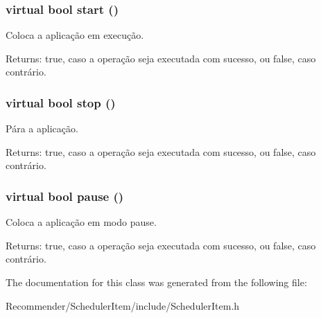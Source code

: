 \subsubsection{\setlength{\rightskip}{0pt plus 5cm}virtual bool start ()\hspace{0.3cm}{\tt  [pure virtual]}}\label{classbr_1_1ufscar_1_1lince_1_1ginga_1_1recommender_1_1SchedulerItem_d64c54ab3191981b2443c47007f38516}


Coloca a aplicação em execução. \begin{Desc}
\item[Returns:]true, caso a operação seja executada com sucesso, ou false, caso contrário. \end{Desc}
\subsubsection{\setlength{\rightskip}{0pt plus 5cm}virtual bool stop ()\hspace{0.3cm}{\tt  [pure virtual]}}\label{classbr_1_1ufscar_1_1lince_1_1ginga_1_1recommender_1_1SchedulerItem_913e49a415a81ff266f461523a0c66da}


Pára a aplicação. \begin{Desc}
\item[Returns:]true, caso a operação seja executada com sucesso, ou false, caso contrário. \end{Desc}
\subsubsection{\setlength{\rightskip}{0pt plus 5cm}virtual bool pause ()\hspace{0.3cm}{\tt  [pure virtual]}}\label{classbr_1_1ufscar_1_1lince_1_1ginga_1_1recommender_1_1SchedulerItem_a544dca6a4e7bcd86379018920bb11f4}


Coloca a aplicação em modo pause. \begin{Desc}
\item[Returns:]true, caso a operação seja executada com sucesso, ou false, caso contrário. \end{Desc}


The documentation for this class was generated from the following file:\begin{CompactItemize}
\item 
Recommender/SchedulerItem/include/SchedulerItem.h\end{CompactItemize}
